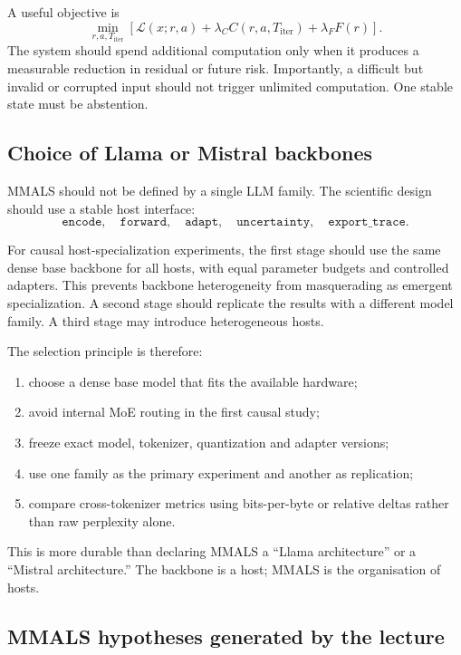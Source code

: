 A useful objective is
\[
\min_{r,a,T_{\mathrm{iter}}}
\left[
\mathcal L(x;r,a)
+\lambda_C C(r,a,T_{\mathrm{iter}})
+\lambda_F F(r)
\right].
\]
The system should spend additional computation only when it produces a measurable reduction in residual or future risk. Importantly, a difficult but invalid or corrupted input should not trigger unlimited computation. One stable state must be abstention.

\subsection{Choice of Llama or Mistral backbones}

MMALS should not be defined by a single LLM family. The scientific design should use a stable host interface:
\[
\texttt{encode},\quad
\texttt{forward},\quad
\texttt{adapt},\quad
\texttt{uncertainty},\quad
\texttt{export\_trace}.
\]

For causal host-specialization experiments, the first stage should use the same dense base backbone for all hosts, with equal parameter budgets and controlled adapters. This prevents backbone heterogeneity from masquerading as emergent specialization. A second stage should replicate the results with a different model family. A third stage may introduce heterogeneous hosts.

The selection principle is therefore:

\begin{enumerate}[leftmargin=*]
  \item choose a dense base model that fits the available hardware;
  \item avoid internal MoE routing in the first causal study;
  \item freeze exact model, tokenizer, quantization and adapter versions;
  \item use one family as the primary experiment and another as replication;
  \item compare cross-tokenizer metrics using bits-per-byte or relative deltas rather than raw perplexity alone.
\end{enumerate}

This is more durable than declaring MMALS a ``Llama architecture'' or a ``Mistral architecture.'' The backbone is a host; MMALS is the organisation of hosts.

\subsection{MMALS hypotheses generated by the lecture}

